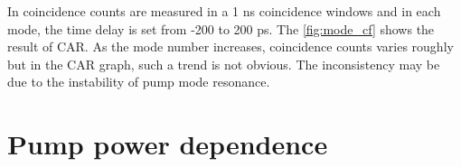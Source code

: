 In coincidence counts are measured in a 1 ns coincidence windows and in each mode, the time delay is set from -200 to 200 ps. The \autoref{fig:mode_cf} shows the result of CAR. As the mode number increases, coincidence counts varies roughly but in the CAR graph, such a trend is not obvious. The inconsistency may be due to the instability of pump mode resonance.


\begin{figure}
	\centering
	
	\label{fig:mode_cf}
\end{figure}




\section{Pump power dependence}


\begin{figure}
	\centering
	
	\mycaption{}{}
	\label{fig:pwflux}
\end{figure}

\begin{figure}
	\centering
	
	\mycaption{}{}
	\label{fig:pwcar}
\end{figure}


